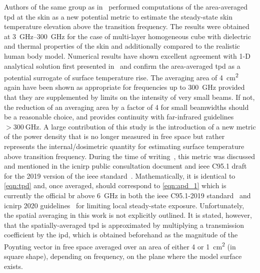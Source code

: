 Authors of the same group as in~\cite{Funahashi2018Averaging} performed computations of the area-averaged \gls{tpd} at the skin as a new potential metric to estimate the steady-state skin temperature elevation above the transition frequency.
The results were obtained at \SIrange[range-units=single,range-phrase=--]{3}{300}{\GHz} for the case of multi-layer homogeneous cube with dielectric and thermal properties of the skin and additionally compared to the realistic human body model.
Numerical results have shown excellent agreement with 1-D analytical solution first presented in~\cite{Foster2017Thermal} and confirm the area-averaged \gls{tpd} as a potential surrogate of surface temperature rise.
The averaging area of \SI{4}{\cm\squared} again have been shown as appropriate for frequencies up to \SI{300}{\GHz} provided that they are supplemented by limits on the intensity of very small beams.
If not, the reduction of an averaging area by a factor of 4 for small beamwidths should be a reasonable choice, and provides continuity with far-infrared guidelines $ > \SI{300}{\GHz}$.
A large contribution of this study is the introduction of a new metric of the power density that is no longer measured in free space but rather represents the internal/dosimetric quantity for estimating surface temperature above transition frequency.
During the time of writing~\cite{Funahashi2018Averaging}, this metric was discussed and mentioned in the \gls{icnirp} public consultation document and \gls{ieee} C95.1 draft for the 2019 version of the \gls{ieee} standard~\cite{IEEE2019Standard}.
Mathematically, it is identical to \cref{eqn:tpd} and, once averaged, should correspond to \cref{eqn:apd_1} which is currently the official \gls{br} above \SI{6}{\GHz} in both the \gls{ieee} C95.1-2019 standard~\cite{IEEE2019Standard} and \gls{icnirp} 2020 guidelines~\cite{ICNIRP2020Guidelines} for limiting local steady-state exposure.
Unfortunately, the spatial averaging in this work is not explicitly outlined.
It is stated, however, that the spatially-averaged \gls{tpd} is approximated by multiplying a transmission coefficient by the \gls{ipd}, which is obtained beforehand as the magnitude of the Poynting vector in free space averaged over an area of either \SI{4}{} or \SI{1}{\cm\squared} (in square shape), depending on frequency, on the plane where the model surface exists.

